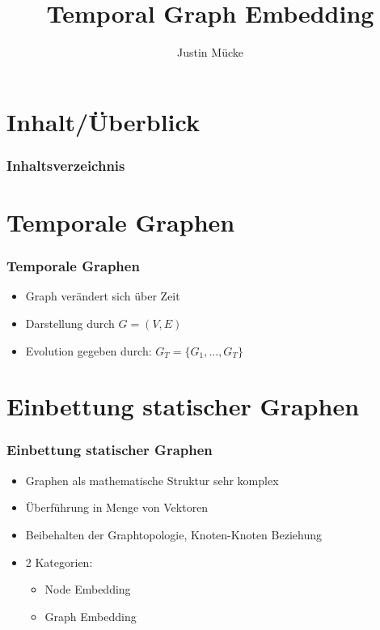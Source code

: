 \documentclass{beamer}
\title{Temporal Graph Embedding}
\subtitle{}
\author{Justin Mücke}
\institute
{Universität Ulm, Seminar Data-Science\\}
\begin{document}
\hspace*{-1.49cm}
\frame[plain]{\titlepage}

\hspace*{-0.7cm}
\section*{Inhalt/Überblick} %
\begin{frame}
  \frametitle{Inhaltsverzeichnis}
  \tableofcontents
\end{frame}


\section{Temporale Graphen}
\begin{frame}
  \frametitle{Temporale Graphen}
  \begin{itemize}
    \item Graph verändert sich über Zeit
    \item Darstellung durch \(G=(V,E)\)
    \item Evolution gegeben durch: \(G_T =\{G_1, \ldots, G_T\}\)
  \end{itemize}
\end{frame}

\section{Einbettung statischer Graphen}
\begin{frame}
  \frametitle{Einbettung statischer Graphen}
  \begin{itemize}
    \item Graphen als mathematische Struktur sehr komplex
    \item Überführung in Menge von Vektoren
    \item Beibehalten der Graphtopologie, Knoten-Knoten Beziehung 
    \item 2 Kategorien:
    \begin{itemize}
      \item Node Embedding
      \item Graph Embedding
    \end{itemize} 
  \end{itemize}
\end{frame}
\end{document}
